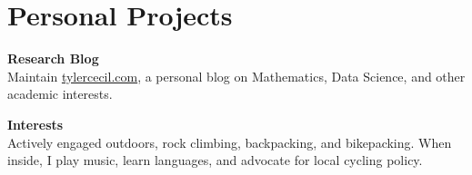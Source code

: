 \documentclass{tc_cv}
\begin{document}
\begin{minipage}[t]{0.3\linewidth}
  \vspace{2em}
  \section{Personal Projects}
  \textbf{Research Blog}\\
  Maintain \href{https://tylercecil.com}{tylercecil.com}, a personal blog on
  Mathematics, Data Science, and other academic interests.
  \vspace{0.25em}

  \textbf{Interests}\\
  Actively engaged outdoors, rock climbing, backpacking, and bikepacking. When
  inside, I play music, learn languages, and advocate for local cycling policy.

\end{minipage}
\hfill\vline\hfill
\end{document}
